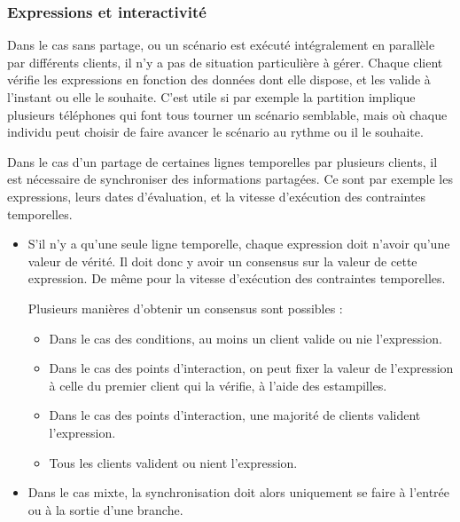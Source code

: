 \documentclass[10pt]{article}
\begin{document}
\begin{figure}[h]
	\centering
	\begin{tikzpicture}
	
	\end{tikzpicture}
	\label{scenar.non-interactif}
\end{figure}


\subsubsection{Expressions et interactivité}
\label{section.expr-interact}
Dans le cas sans partage, ou un scénario est exécuté intégralement en parallèle par différents clients, il n'y a pas de situation particulière à gérer.
Chaque client vérifie les expressions en fonction des données dont elle dispose, et les valide à l'instant ou elle le souhaite. 
C'est utile si par exemple la partition implique plusieurs téléphones qui font tous tourner un scénario semblable, mais où chaque individu peut choisir de faire avancer le scénario au rythme ou il le souhaite.

Dans le cas d'un partage de certaines lignes temporelles par plusieurs clients, il est nécessaire de synchroniser des informations partagées.
Ce sont par exemple les expressions, leurs dates d'évaluation, et la vitesse d'exécution des contraintes temporelles.

\begin{itemize}
	\item S'il n'y a qu'une seule ligne temporelle, chaque expression doit n'avoir qu'une valeur de vérité. 
    Il doit donc y avoir un consensus sur la valeur de cette expression. 
    De même pour la vitesse d'exécution des contraintes temporelles.
    
    Plusieurs manières d'obtenir un consensus sont possibles : 
    \begin{itemize}
        \item Dans le cas des conditions, au moins un client valide ou nie l'expression. 
        \item Dans le cas des points d'interaction, on peut fixer la valeur de l'expression à celle du premier client qui la vérifie, à l'aide des estampilles. %
        \item Dans le cas des points d'interaction, une majorité de clients valident l'expression.
        \item Tous les clients valident ou nient l'expression.
    \end{itemize}

	\item Dans le cas mixte, la synchronisation doit alors uniquement se faire à l'entrée ou à la sortie d'une branche.
\end{itemize}
\end{document}
